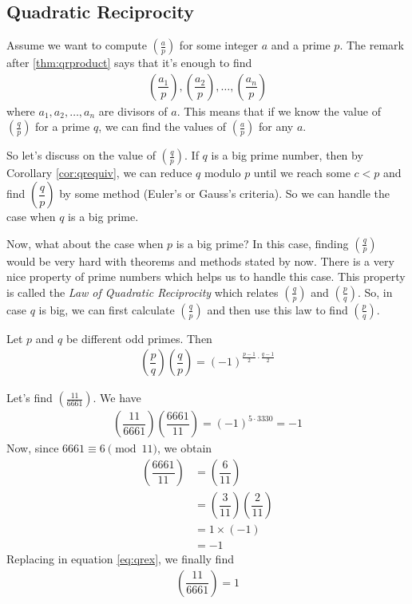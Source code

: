 \documentclass[main.tex]{subfile}
\begin{document}
	\subsection{Quadratic Reciprocity}
	Assume we want to compute $ \left(\frac{a}{p}\right)$ for some integer $a$ and a prime $p$. The remark after \autoref{thm:qrproduct} says that it's enough to find
		\begin{align*}
			\left(\dfrac{a_1}{p}\right), \left(\dfrac{a_2}{p}\right), \ldots, \left(\dfrac{a_n}{p}\right)
		\end{align*}
	where $a_1,a_2,\ldots,a_n$ are divisors of $a$. This means that if we know the value of $\left(\frac{q}{p}\right)$ for a prime $q$, we can find the values of $\left(\frac{a}{p}\right)$ for any $a$.

	So let's discuss on the value of $\left(\frac{q}{p}\right)$. If $q$ is a big prime number, then by Corollary \ref{cor:qrequiv}, we can reduce $q$ modulo $p$ until we reach some $c<p$ and find $\left(\dfrac{q}{p}\right)$ by some method (Euler's or Gauss's criteria). So we can handle the case when $q$ is a big prime.

	Now, what about the case when $p$ is a big prime? In this case, finding $\left(\frac{q}{p}\right)$ would be very hard with theorems and methods stated by now. There is a very nice property of prime numbers which helps us to handle this case. This property is called the \textit{Law of Quadratic Reciprocity} which relates $\left(\frac{q}{p}\right)$ and $\left(\frac{p}{q}\right)$. So, in case $q$ is big, we can first calculate $\left(\frac{q}{p}\right)$ and then use this law to find $\left(\frac{p}{q}\right)$.

	\begin{theorem}\label{thm:lawofqr}
		Let $p$ and $q$ be different odd primes. Then
		\begin{align*}
			\left(\dfrac{p}{q}\right)\left(\dfrac{q}{p}\right)=(-1)^{\frac{p-1}{2}\cdot \frac{q-1}{2}}
		\end{align*}
	\end{theorem}

	\begin{example}
		Let's find $\left(\frac{11}{6661}\right)$. We have
		\begin{align}\label{eq:qrex}
			\left(\dfrac{11}{6661}\right) \left(\dfrac{6661}{11}\right)=(-1)^{5\cdot 3330}=-1
		\end{align}
		Now, since $6661 \equiv 6 \pmod{11}$, we obtain
		\begin{align*}
		\left(\dfrac{6661}{11}\right)
			& = \left(\dfrac{6}{11}\right)\\
			& = \left(\dfrac{3}{11}\right)\left(\dfrac{2}{11}\right)\\
			& =1 \times (-1)\\
			& = -1
		\end{align*}
		Replacing in equation \eqref{eq:qrex}, we finally find
		\begin{align*}
		\left(\dfrac{11}{6661}\right) = 1
		\end{align*}
	\end{example}
\end{document}
